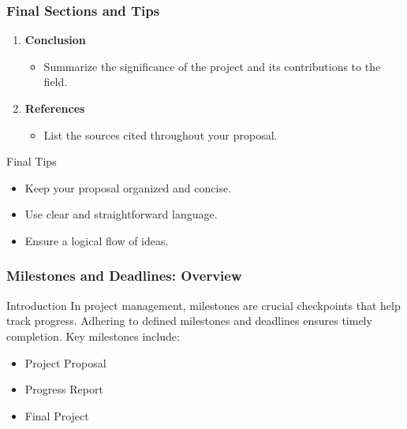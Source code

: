\documentclass[aspectratio=169]{beamer}
\begin{document}
\begin{frame}[fragile]
  \frametitle{Final Sections and Tips}
  \begin{enumerate}[resume]
    \item \textbf{Conclusion}
    \begin{itemize}
      \item Summarize the significance of the project and its contributions to the field.
    \end{itemize}

    \item \textbf{References}
    \begin{itemize}
      \item List the sources cited throughout your proposal.
    \end{itemize}
  \end{enumerate}
  
  \begin{block}{Final Tips}
    \begin{itemize}
      \item Keep your proposal organized and concise.
      \item Use clear and straightforward language.
      \item Ensure a logical flow of ideas.
    \end{itemize}
  \end{block}
\end{frame}

\begin{frame}[fragile]
  \frametitle{Milestones and Deadlines: Overview}
  \begin{block}{Introduction}
    In project management, milestones are crucial checkpoints that help track progress. Adhering to defined milestones and deadlines ensures timely completion. Key milestones include:
    \begin{itemize}
      \item Project Proposal
      \item Progress Report
      \item Final Project
    \end{itemize}
  \end{block}
\end{frame}
\end{document}
